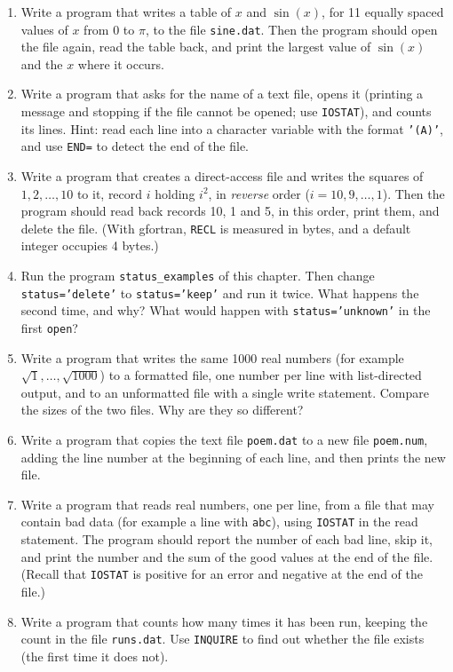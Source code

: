 \begin{enumerate}
    \item Write a program that writes a table of $x$ and $\sin(x)$, for 11 equally spaced values of $x$ from 0 to $\pi$, to the file \texttt{sine.dat}. Then the program should open the file again, read the table back, and print the largest value of $\sin(x)$ and the $x$ where it occurs.
    \item Write a program that asks for the name of a text file, opens it (printing a message and stopping if the file cannot be opened; use \texttt{IOSTAT}), and counts its lines. Hint: read each line into a character variable with the format \texttt{'(A)'}, and use \texttt{END=} to detect the end of the file.
    \item Write a program that creates a direct-access file and writes the squares of $1, 2, \ldots, 10$ to it, record $i$ holding $i^2$, in \emph{reverse} order ($i = 10, 9, \ldots, 1$). Then the program should read back records 10, 1 and 5, in this order, print them, and delete the file. (With gfortran, \texttt{RECL} is measured in bytes, and a default integer occupies 4 bytes.)
    \item Run the program \texttt{status\_examples} of this chapter. Then change \texttt{status='delete'} to \texttt{status='keep'} and run it twice. What happens the second time, and why? What would happen with \texttt{status='unknown'} in the first \texttt{open}?
    \item Write a program that writes the same 1000 real numbers (for example $\sqrt{1}, \ldots, \sqrt{1000}$) to a formatted file, one number per line with list-directed output, and to an unformatted file with a single write statement. Compare the sizes of the two files. Why are they so different?
    \item Write a program that copies the text file \texttt{poem.dat} to a new file \texttt{poem.num}, adding the line number at the beginning of each line, and then prints the new file.
    \item Write a program that reads real numbers, one per line, from a file that may contain bad data (for example a line with \texttt{abc}), using \texttt{IOSTAT} in the read statement. The program should report the number of each bad line, skip it, and print the number and the sum of the good values at the end of the file. (Recall that \texttt{IOSTAT} is positive for an error and negative at the end of the file.)
    \item Write a program that counts how many times it has been run, keeping the count in the file \texttt{runs.dat}. Use \texttt{INQUIRE} to find out whether the file exists (the first time it does not).
\end{enumerate}
